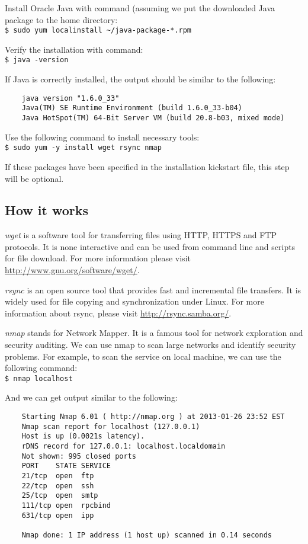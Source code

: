 Install Oracle Java with command (assuming we put the downloaded Java package to the home directory: \\
\verb|$ sudo yum localinstall ~/java-package-*.rpm|

Verify the installation with command: \\
\verb|$ java -version|

If Java is correctly installed, the output should be similar to the following:
\begin{verbatim}
    java version "1.6.0_33"
    Java(TM) SE Runtime Environment (build 1.6.0_33-b04)
    Java HotSpot(TM) 64-Bit Server VM (build 20.8-b03, mixed mode)
\end{verbatim}

Use the following command to install necessary tools: \\
\verb|$ sudo yum -y install wget rsync nmap|

If these packages have been specified in the installation kickstart file, this step will be optional.

\subsection*{How it works}
\emph{wget} is a software tool for transferring files using HTTP, HTTPS and FTP protocols. It is none interactive and can be used from command line and scripts for file download. For more information please visit \href{http://www.gnu.org/software/wget/}{http://www.gnu.org/software/wget/}.

\emph{rsync} is an open source tool that provides fast and incremental file transfers. It is widely used for file copying and synchronization under Linux. For more information about rsync, please visit \href{http://rsync.samba.org/}{http://rsync.samba.org/}.

\emph{nmap} stands for Network Mapper. It is a famous tool for network exploration and security auditing. We can use nmap to scan large networks and identify security problems. For example, to scan the service on local machine, we can use the following command:\\
\verb|$ nmap localhost|

And we can get output similar to the following:
\begin{verbatim}
    Starting Nmap 6.01 ( http://nmap.org ) at 2013-01-26 23:52 EST
    Nmap scan report for localhost (127.0.0.1)
    Host is up (0.0021s latency).
    rDNS record for 127.0.0.1: localhost.localdomain
    Not shown: 995 closed ports
    PORT    STATE SERVICE
    21/tcp  open  ftp
    22/tcp  open  ssh
    25/tcp  open  smtp
    111/tcp open  rpcbind
    631/tcp open  ipp

    Nmap done: 1 IP address (1 host up) scanned in 0.14 seconds
\end{verbatim}

